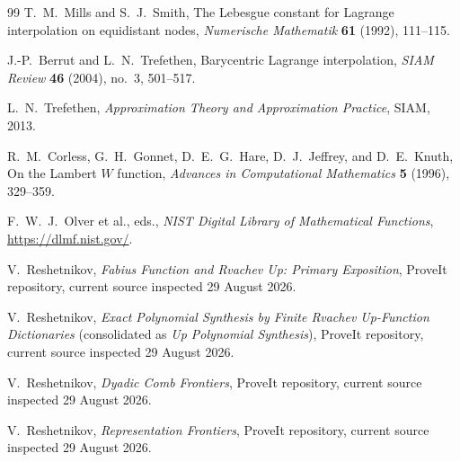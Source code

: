 \documentclass[11pt,oneside]{article}
\theoremstyle{definition}
\theoremstyle{remark}
\newcommand{\1}{\mathbf{1}}
\begin{document}
\begin{thebibliography}{99}
T.~M.~Mills and S.~J.~Smith,
\newblock The Lebesgue constant for Lagrange interpolation on equidistant
nodes,
\newblock \emph{Numerische Mathematik} \textbf{61} (1992), 111--115.

J.-P.~Berrut and L.~N.~Trefethen,
\newblock Barycentric Lagrange interpolation,
\newblock \emph{SIAM Review} \textbf{46} (2004), no.~3, 501--517.

L.~N.~Trefethen,
\newblock \emph{Approximation Theory and Approximation Practice},
\newblock SIAM, 2013.

R.~M.~Corless, G.~H.~Gonnet, D.~E.~G.~Hare, D.~J.~Jeffrey, and D.~E.~Knuth,
\newblock On the Lambert $W$ function,
\newblock \emph{Advances in Computational Mathematics} \textbf{5} (1996),
329--359.

F.~W.~J.~Olver et al., eds.,
\newblock \emph{NIST Digital Library of Mathematical Functions},
\newblock \url{https://dlmf.nist.gov/}.

V.~Reshetnikov,
\newblock \emph{Fabius Function and Rvachev Up: Primary Exposition},
\newblock ProveIt repository, current source inspected 29 August 2026.

V.~Reshetnikov,
\newblock \emph{Exact Polynomial Synthesis by Finite Rvachev Up-Function
Dictionaries} (consolidated as \emph{Up Polynomial Synthesis}),
\newblock ProveIt repository, current source inspected 29 August 2026.

V.~Reshetnikov,
\newblock \emph{Dyadic Comb Frontiers},
\newblock ProveIt repository, current source inspected 29 August 2026.

V.~Reshetnikov,
\newblock \emph{Representation Frontiers},
\newblock ProveIt repository, current source inspected 29 August 2026.

\end{thebibliography}
\end{document}
